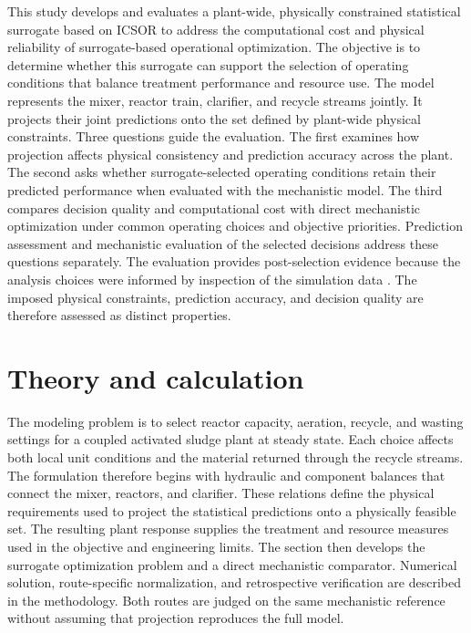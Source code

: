 \documentclass[a4paper,fleqn]{cas-sc}
\begin{document}
This study develops and evaluates a plant-wide, physically constrained statistical surrogate based on ICSOR to address the computational cost and physical reliability of surrogate-based operational optimization. The objective is to determine whether this surrogate can support the selection of operating conditions that balance treatment performance and resource use. The model represents the mixer, reactor train, clarifier, and recycle streams jointly. It projects their joint predictions onto the set defined by plant-wide physical constraints. Three questions guide the evaluation. The first examines how projection affects physical consistency and prediction accuracy across the plant. The second asks whether surrogate-selected operating conditions retain their predicted performance when evaluated with the mechanistic model. The third compares decision quality and computational cost with direct mechanistic optimization under common operating choices and objective priorities. Prediction assessment and mechanistic evaluation of the selected decisions address these questions separately. The evaluation provides post-selection evidence because the analysis choices were informed by inspection of the simulation data \citep{Kaufman2012}. The imposed physical constraints, prediction accuracy, and decision quality are therefore assessed as distinct properties.

\section{Theory and calculation}

The modeling problem is to select reactor capacity, aeration, recycle, and wasting settings for a coupled activated sludge plant at steady state. Each choice affects both local unit conditions and the material returned through the recycle streams. The formulation therefore begins with hydraulic and component balances that connect the mixer, reactors, and clarifier. These relations define the physical requirements used to project the statistical predictions onto a physically feasible set. The resulting plant response supplies the treatment and resource measures used in the objective and engineering limits. The section then develops the surrogate optimization problem and a direct mechanistic comparator. Numerical solution, route-specific normalization, and retrospective verification are described in the methodology. Both routes are judged on the same mechanistic reference without assuming that projection reproduces the full model.
\end{document}
